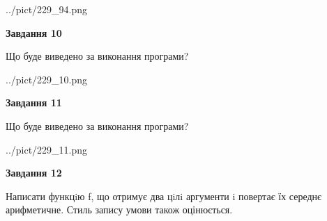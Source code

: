 \documentclass[12pt, ukrainian]{article}
\begin{document}
{\begin {large}
\begin{center}
	{../pict/229_94.png}
\end{center}
\newpage

{\begin {center}\textbf{Завдання 10}\end {center}}

Що буде виведено за виконання програми?\par
\begin{center}
	{../pict/229_10.png}
\end{center}
\newpage

{\begin {center}\textbf{Завдання 11}\end {center}}

Що буде виведено за виконання програми?\par
\begin{center}
	{../pict/229_11.png}
\end{center}
\newpage

{\begin {center}\textbf{Завдання 12}\end {center}}


Написати функцiю f, що отримує два цiлi аргументи i повертає їх середнє арифметичне. Стиль запису умови також оцінюється.\par
\newpage

\end {large}}
\end{document}

